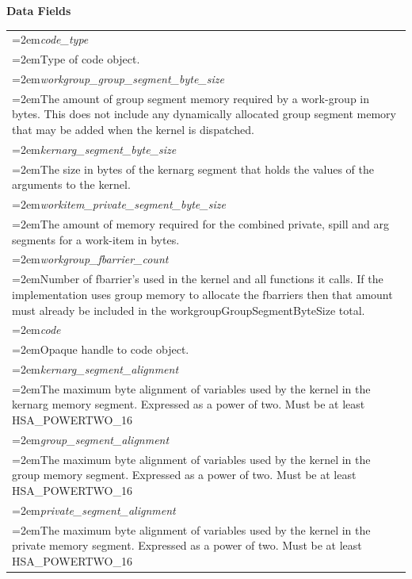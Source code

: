 \documentclass[final]{book}
\newcommand{\reffld}[1]{\textit{#1}}
\begin{document}
\begin{appendices}
\noindent\textbf{Data Fields}\\[-6mm]
\begin{longtable}{@{}>{\hangindent=2em}p{\textwidth}}
\reffld{code_type}\\\hspace{2em}Type of code object.\\[2mm]
\reffld{workgroup_group_segment_byte_size}\\\hspace{2em}The amount of group segment memory required by a work-group in bytes. This does not include any dynamically allocated group segment memory that may be added when the kernel is dispatched.\\[2mm]
\reffld{kernarg_segment_byte_size}\\\hspace{2em}The size in bytes of the kernarg segment that holds the values of the arguments to the kernel.\\[2mm]
\reffld{workitem_private_segment_byte_size}\\\hspace{2em}The amount of memory required for the combined private, spill and arg segments for a work-item in bytes.\\[2mm]
\reffld{workgroup_fbarrier_count}\\\hspace{2em}Number of fbarrier's used in the kernel and all functions it calls. If the implementation uses group memory to allocate the fbarriers then that amount must already be included in the workgroupGroupSegmentByteSize total.\\[2mm]
\reffld{code}\\\hspace{2em}Opaque handle to code object.\\[2mm]
\reffld{kernarg_segment_alignment}\\\hspace{2em}The maximum byte alignment of variables used by the kernel in the kernarg memory segment. Expressed as a power of two. Must be at least HSA_POWERTWO_16\\[2mm]
\reffld{group_segment_alignment}\\\hspace{2em}The maximum byte alignment of variables used by the kernel in the group memory segment. Expressed as a power of two. Must be at least HSA_POWERTWO_16\\[2mm]
\reffld{private_segment_alignment}\\\hspace{2em}The maximum byte alignment of variables used by the kernel in the private memory segment. Expressed as a power of two. Must be at least HSA_POWERTWO_16\\[2mm]

\end{longtable}
\end{appendices}
\end{document}
